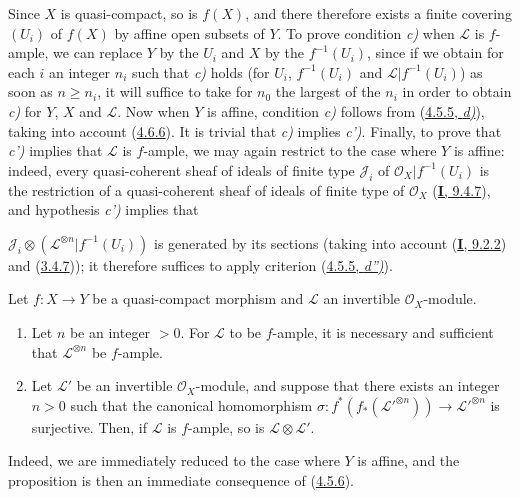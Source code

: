 Since $X$ is quasi-compact, so is $f(X)$, and there therefore exists
a finite covering $(U_i)$ of $f(X)$ by affine open subsets of $Y$. To
prove condition \emph{c)} when $\mathcal{L}$ is $f$-ample, we can
replace $Y$ by the $U_i$ and $X$ by the $f^{-1}(U_i)$, since if we obtain
for each $i$ an integer $n_i$ such that \emph{c)} holds (for $U_i$,
$f^{-1}(U_i)$ and $\mathcal{L}|f^{-1}(U_i)$) as soon as $n\geq n_i$, it
will suffice to take for $n_0$ the largest of the $n_i$ in order to obtain \emph{c)} for
$Y$, $X$ and $\mathcal{L}$. Now when $Y$ is affine, condition \emph{c)}
follows from (\hyperref[II.4.5.5]{4.5.5, \emph{d)}}), taking into account
(\hyperref[II.4.6.6]{4.6.6}). It is trivial that \emph{c)} implies \emph{c')}. Finally,
to prove that \emph{c')} implies that $\mathcal{L}$ is $f$-ample, we may
again restrict to the case where $Y$ is affine: indeed, every quasi-coherent
sheaf of ideals of finite type $\mathcal{J}_i$ of
$\mathcal{O}_X|f^{-1}(U_i)$ is the restriction of a quasi-coherent sheaf
of ideals of finite type of $\mathcal{O}_X$
(\hyperref[I.9.4.7]{\textbf{I}, 9.4.7}), and hypothesis \emph{c')} implies that


$\mathcal{J}_i\otimes(\mathcal{L}^{\otimes n}|f^{-1}(U_i))$ is generated
by its sections (taking into account (\hyperref[I.9.2.2]{\textbf{I}, 9.2.2}) and
(\hyperref[II.3.4.7]{3.4.7})); it therefore suffices to apply criterion
(\hyperref[II.4.5.5]{4.5.5, \emph{d'')}}).

\begin{proposition}[4.6.9]
\label{II.4.6.9}
Let $f:X\to Y$ be a quasi-compact morphism and $\mathcal{L}$ an invertible
$\mathcal{O}_X$-module.
\begin{enumerate}
  \item[\rm{(i)}] Let $n$ be an integer $>0$. For $\mathcal{L}$ to be
  $f$-ample, it is necessary and sufficient that $\mathcal{L}^{\otimes n}$ be
  $f$-ample.
  \item[\rm{(ii)}] Let $\mathcal{L}'$ be an invertible $\mathcal{O}_X$-module,
  and suppose that there exists an integer $n>0$ such that
  the canonical homomorphism
  $\sigma:f^*(f_*(\mathcal{L}'^{\otimes n}))\to
  \mathcal{L}'^{\otimes n}$ is surjective. Then, if $\mathcal{L}$ is
  $f$-ample, so is $\mathcal{L}\otimes\mathcal{L}'$.
\end{enumerate}
\end{proposition}

Indeed, we are immediately reduced to the case where $Y$ is affine, and the proposition
is then an immediate consequence of (\hyperref[II.4.5.6]{4.5.6}).

